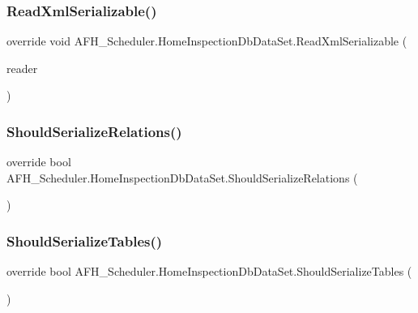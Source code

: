 \subsubsection{ReadXmlSerializable()}
{\footnotesize\ttfamily override void A\+F\+H\+\_\+\+Scheduler.\+Home\+Inspection\+Db\+Data\+Set.\+Read\+Xml\+Serializable (\begin{DoxyParamCaption}\item[{global\+::\+System.\+Xml.\+Xml\+Reader}]{reader }\end{DoxyParamCaption})\hspace{0.3cm}{\ttfamily [protected]}}

\mbox{\label{class_a_f_h___scheduler_1_1_home_inspection_db_data_set_af1e3ffff058ba760deb48973e2784554}} 
\subsubsection{ShouldSerializeRelations()}
{\footnotesize\ttfamily override bool A\+F\+H\+\_\+\+Scheduler.\+Home\+Inspection\+Db\+Data\+Set.\+Should\+Serialize\+Relations (\begin{DoxyParamCaption}{ }\end{DoxyParamCaption})\hspace{0.3cm}{\ttfamily [protected]}}

\mbox{\label{class_a_f_h___scheduler_1_1_home_inspection_db_data_set_a01bb5333f2d7bf6bc6392d4f25f0dc75}} 
\subsubsection{ShouldSerializeTables()}
{\footnotesize\ttfamily override bool A\+F\+H\+\_\+\+Scheduler.\+Home\+Inspection\+Db\+Data\+Set.\+Should\+Serialize\+Tables (\begin{DoxyParamCaption}{ }\end{DoxyParamCaption})\hspace{0.3cm}{\ttfamily [protected]}}



